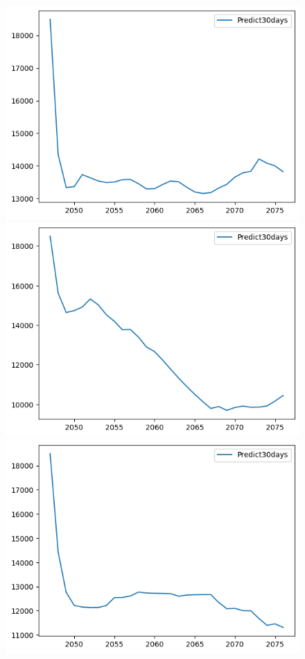 \begin{figure}[H]
\begin{minipage}{0.15\textwidth}
    \includegraphics[width=1\textwidth]{resources/chapter-5/predicted/KF_EXIM_7_3_30days.png}
    \end{minipage}
    \hfill
    \begin{minipage}{0.15\textwidth}
    \centering
    \includegraphics[width=1\textwidth]{resources/chapter-5/predicted/KF_EXIM_8_2_30days.png}
    \end{minipage}
    \hfill
        \begin{minipage}{0.15\textwidth}
    \centering
    \includegraphics[width=1\textwidth]{resources/chapter-5/predicted/KF_EXIM_9_1_30days.png}

\end{minipage}
\end{figure}
